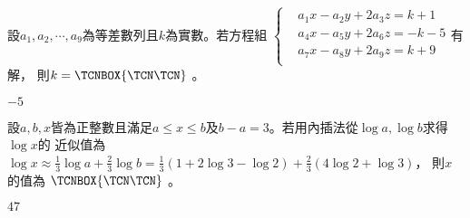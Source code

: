 \begin{QUESTION}
    \begin{QBODY}
        設${{a}_{1}},{{a}_{2}},\cdots ,{{a}_{9}}$為等差數列且$k$為實數。若方程組
        $\left\{ \begin{aligned}
        & {{a}_{1}}x-{{a}_{2}}y+2{{a}_{3}}z=k+1 \\ 
        & {{a}_{4}}x-{{a}_{5}}y+2{{a}_{6}}z=-k-5 \\ 
        & {{a}_{7}}x-{{a}_{8}}y+2{{a}_{9}}z=k+9 \\ 
        \end{aligned} \right.$有解，
        則$k=\TCNBOX{\TCN\TCN}$      。
        
    \end{QBODY}
    \begin{QFROMS}
    \end{QFROMS}
    \begin{QTAGS}
    \end{QTAGS}
    \begin{QANS}
        $-5$
    \end{QANS}
    \begin{QSOL}
    \end{QSOL}
    \begin{QEMPTYSPACE}
    \end{QEMPTYSPACE}
\end{QUESTION}
\begin{QUESTION}
    \begin{QBODY}
        設$a,b,x$皆為正整數且滿足$a\le x\le b$及$b-a=3$。若用內插法從$\log a,\log b$求得$\log x$的
        近似值為
        $\log x\approx \frac{1}{3}\log a+\frac{2}{3}\log b=\frac{1}{3}(1+2\log 3-\log 2)+\frac{2}{3}(4\log 2+\log 3)$，
        則$x$的值為 $\TCNBOX{\TCN\TCN}$        。
        
    \end{QBODY}
    \begin{QFROMS}
    \end{QFROMS}
    \begin{QTAGS}
    \end{QTAGS}
    \begin{QANS}
        $47$
    \end{QANS}
    \begin{QSOL}
    \end{QSOL}
    \begin{QEMPTYSPACE}
    \end{QEMPTYSPACE}
\end{QUESTION}

